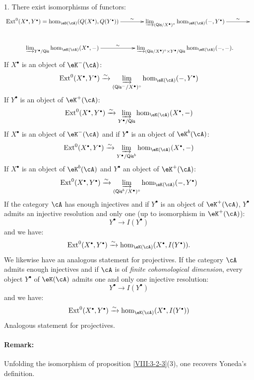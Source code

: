 \begin{proposition}\label{VIII:3-2-3}
1. There exist isomorphisms of functors: 
\[\xymatrix{
  \ext^0(X^\bullet,Y^\bullet) = \hom_{\eD(\cA)}(Q(X^\bullet),Q(Y^\bullet)) \ar[r]^-\sim 
    & \varinjlim_{(\mathsf{Qis}/X^\bullet)^\circ} \hom_{\eK(\cA)}(-,Y^\bullet) \ar[r]^-\sim 
    & \\
  \varinjlim_{Y^\bullet/\mathsf{Qis}} \hom_{\eK(\cA)}(X^\bullet,-) \ar[r]^-\sim 
    & \varinjlim_{(\mathsf{Qis}/X^\bullet)^\circ \times Y^\bullet/\mathsf{Qis}} \hom_{\eK(\cA)}(-,-) \text{.}
}\]
If $X^\bullet$ is an object of $\eK^-(\cA)$: 
\[
  \ext^0(X^\bullet,Y^\bullet) \iso \varinjlim_{(\mathsf{Qis}^-/X^\bullet)^\circ} \hom_{\eK(\cA)}(-,Y^\bullet) 
\]
If $Y^\bullet$ is an object of $\eK^+(\cA)$: 
\[
  \ext^0(X^\bullet,Y^\bullet) \iso \varinjlim_{Y^\bullet/\mathsf{Qis}} \hom_{\eK(\cA)}(X^\bullet,-) 
\]
If $X^\bullet$ is an object of $\eK^-(\cA)$ and if $Y^\bullet$ is an
object of $\eK^b(\cA)$: 
\[
  \ext^0(X^\bullet,Y^\bullet) \iso \varinjlim_{Y^\bullet/\mathsf{Qis}^b} \hom_{\eK(\cA)}(X^\bullet,-) 
\]
If $X^\bullet$ is an object of $\eK^b(\cA)$ and $Y^\bullet$ an object of
$\eK^+(\cA)$: 
\[
  \ext^0(X^\bullet,Y^\bullet) \iso \varinjlim_{(\mathsf{Qis}^b/X^\bullet)^\circ} \hom_{\eK(\cA)}(-,Y^\bullet) 
\]
If the category $\cA$ has enough injectives and if
$Y^\bullet$ is an object of $\eK^+(\cA)$, $Y^\bullet$ admits an
injective resolution and only one (up to isomorphism in
$\eK^+(\cA)$): 
\[
  Y^\bullet \to I(Y^\bullet) 
\]
and we have:
\[
  \ext^0(X^\bullet,Y^\bullet) \iso \hom_{\eK(\cA)}(X^\bullet,I(Y^\bullet)) \text{.}
\]
We likewise have an analogous statement for projectives.
If the category $\cA$ admits enough injectives and if $\cA$ is
of \emph{finite cohomological dimension}, every object $Y^\bullet$ of
$\eK(\cA)$ admits one and only one injective resolution:
\[
  Y^\bullet \to I(Y^\bullet)
\]
and we have:
\[
  \ext^0(X^\bullet,Y^\bullet) \iso \hom_{\eK(\cA)}(X^\bullet,I(Y^\bullet))
\]
Analogous statement for projectives.
\end{proposition}

\paragraph{Remark:}
Unfolding the isomorphism of proposition \ref{VIII:3-2-3}(3), one
recovers Yoneda's definition. 










